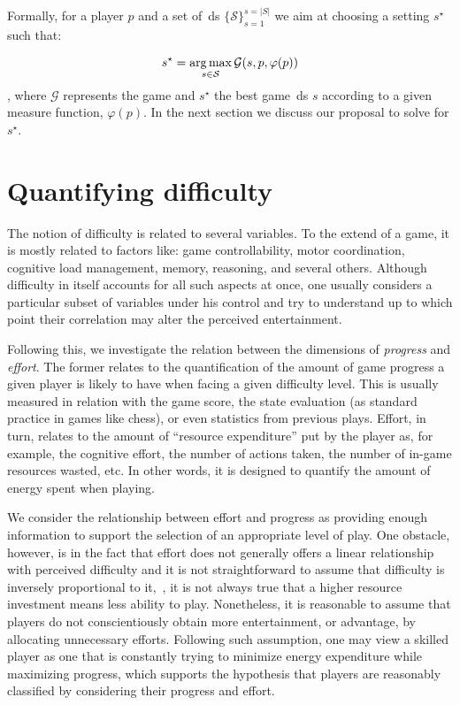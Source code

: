 Formally, for a player $p$ and a set of~\gls{ds} $\{\mathcal{S}\}^{s=|S|}_{s=1}$ we aim at choosing a setting $s^{\star}$ such that:

\begin{equation}
s^{\star} = \operatorname*{arg\,max}_{s \in \mathcal{S}} \mathcal{G}(s,p, \varphi(p))
\end{equation}
, where $\mathcal{G}$ represents the game and $s^{\star}$ the best game~\gls{ds} $s$ according to a given measure function, $\varphi(p)$. In the next section we discuss our proposal to solve for $s^{\star}$.

\section{Quantifying difficulty}\label{sec:quant_difficulty}
The notion of difficulty is related to several variables. To the extend of a game, it is mostly related to factors like: game controllability, motor coordination, cognitive load management, memory, reasoning, and several others. Although difficulty in itself accounts for all such aspects at once, one usually considers a particular subset of variables under his control and try to understand up to which point their correlation may alter the perceived entertainment.

Following this, we investigate the relation between the dimensions of \textit{progress} and \textit{effort}. The former relates to the quantification of the amount of game progress a given player is likely to have when facing a given difficulty level. This is usually measured in relation with the game score, the state evaluation (as standard practice in games like chess), or even statistics from previous plays. Effort, in turn, relates to the amount of ``resource expenditure'' put by the player as, for example, the cognitive effort, the number of actions taken, the number of in-game resources wasted, etc. In other words, it is designed to quantify the amount of energy spent when playing.

We consider the relationship between effort and progress as providing enough information to support the selection of an appropriate level of play. One obstacle, however, is in the fact that effort does not generally offers a linear relationship with perceived difficulty and it is not straightforward to assume that difficulty is inversely proportional to it,~\ie, it is not always true that a higher resource investment means less ability to play. 
Nonetheless, it is reasonable to assume that players do not conscientiously obtain more entertainment, or advantage, by allocating unnecessary efforts. Following such assumption, one may view a skilled player as one that is constantly trying to minimize energy expenditure while maximizing progress, which supports the hypothesis that players are reasonably classified by considering their progress and effort.

